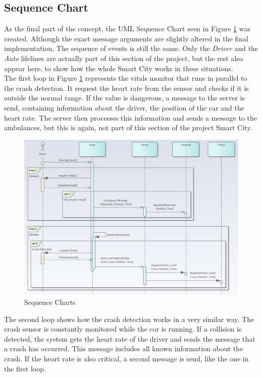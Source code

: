\subsection{Sequence Chart}

\noindent
As the final part of the concept, the UML Sequence Chart seen in 
Figure \ref{6fig:sequenceChart1} was created. 
Although the exact message arguments are slightly altered in the final implementation,
The sequence of events is still the same.
Only the \emph{Driver} and the \emph{Auto} lifelines 
are actually part of this section of the project, 
but the rest also appear here,
to show how the whole Smart City works in these situations. 
\\
\newline
The first loop in Figure \ref{6fig:sequenceChart1} represents the vitals monitor 
that runs in parallel to the crash detection.
It request the heart rate from the sensor
and checks if it is outside the normal range.
If the value is dangerous, a message to the server is send,
containing information about the driver, the position of the car
and the heart rate.
The server then processes this information and sends a message to the ambulances,
but this is again, not part of this section of the project Smart City.

\begin{figure}[H]
  \centering\includegraphics[width=1.0\linewidth]{chapters/chapter6_bruno/Figures/sequence1.png}
  \caption{Sequence Charts}
  \label{6fig:sequenceChart1}
\end{figure}

\noindent
The second loop shows how the crash detection works
in a very similar way.
The crash sensor is constantly monitored while the car is running.
If a collision is detected, the system gets the heart rate of the driver
and sends the message that a crash has occurred.
This message includes all known information about the crash.
If the heart rate is also critical,
a second message is send, like the one in the first loop.